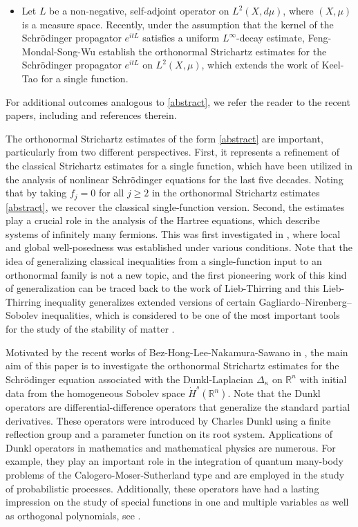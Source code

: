 \documentclass[a4paper,11pt, reqno]{amsart}
\numberwithin{equation}{section}
\theoremstyle{plain}
\theoremstyle{definition}
\theoremstyle{remark}
\begin{document}
\begin{itemize}
     
    \item  Let $L$ be a non-negative, self-adjoint operator on $L^2(X,d\mu)$, where $(X,\mu)$ is a measure space. Recently, under the assumption that the kernel of the Schr\"{o}dinger propagator $e^{itL}$ satisfies a uniform $L^\infty$-decay estimate, Feng-Mondal-Song-Wu \cite{FMSW} establish the orthonormal Strichartz estimates for the Schr\"{o}dinger propagator $e^{itL}$ on $L^2(X,\mu)$, which extends the work of Keel-Tao \cite{KT} for a single function. 
\end{itemize}
For additional outcomes analogous to \eqref{abstract}, we refer the reader to the 
 recent papers, including \cite{Feng-Song, MS, Nguyen, nakamura, BEZ, Hoshiya, Ren-Zhang,Wang-Zhang-Zhang, FS1, GMS, shyam} and references therein. 

 
  The orthonormal Strichartz estimates of the form \eqref{abstract} are important, particularly from two different perspectives. First, it represents a refinement of the classical Strichartz estimates for a single function, which have been utilized in the analysis of nonlinear Schrödinger equations for the last five decades.  Noting that by taking 
$f_j=0$ for all  $j\geq 2$  in the orthonormal Strichartz estimates \eqref{abstract}, we recover the classical single-function version.  Second, the estimates play a crucial role in the analysis of the Hartree equations, which describe systems of infinitely many fermions. This was first investigated in \cite{LS}, where local and global well-posedness was established under various conditions.  Note that the idea of generalizing classical inequalities from a single-function input to an orthonormal family is not a new topic, and the first pioneering work of this kind of generalization can be traced back to the work of  Lieb-Thirring  \cite{lieb, liebb} and this Lieb-Thirring inequality generalizes extended versions of certain Gagliardo–Nirenberg–Sobolev inequalities, which is considered to be one of the most important tools for the study of the stability of matter \cite{lieb}.  

Motivated by the recent works of Bez-Hong-Lee-Nakamura-Sawano in  \cite{Bez-Hong-Lee-Nakamura-Sawano},  the main aim of this paper is to investigate the orthonormal Strichartz estimates for the Schr\"odinger equation associated with the  Dunkl-Laplacian $\Delta_\kappa$  on $\mathbb{R}^n$   with initial data from the homogeneous Sobolev space $\dot{H}^s(\mathbb{R}^n)$.  Note that the 	Dunkl operators are differential-difference operators that generalize the standard partial derivatives.   These operators were introduced by Charles Dunkl \cite{dun1991} using a finite reflection group and a parameter function on its root system.   Applications of Dunkl operators in mathematics and mathematical physics are numerous. For example, they play an important role in the integration of quantum many-body problems of the Calogero-Moser-Sutherland type and are employed in the study of probabilistic processes. Additionally, these operators have had a lasting impression on the study of special functions in one and multiple variables as well as orthogonal polynomials,  see \cite{Dunkl book}.  
\end{document}
